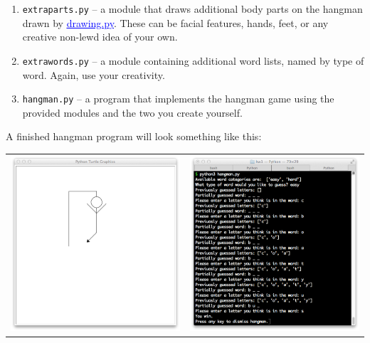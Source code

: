 \documentclass[12pt]{article}
\newcommand{\link}[2]{\href{#1}{\textcolor{blue}{\underline{#2}}}}
\newcommand{\code}{http://www.cc.gatech.edu/~simpkins/teaching/gatech/cs2316/code}
\begin{document}
\begin{enumerate}
\itemsep0em
\item {\tt extraparts.py} -- a module that draws additional body parts on the hangman drawn by \link{\code/hanglib/drawing.py}{drawing.py}.  These can be facial features, hands, feet, or any creative non-lewd idea of your own.
\item {\tt extrawords.py} -- a module containing additional word lists, named by type of word.  Again, use your creativity.
\item {\tt hangman.py} -- a program that implements the hangman game using the provided modules and the two you create yourself.
\end{enumerate}

A finished hangman program will look something like this:

\begin{tabular}{cc}
\includegraphics[width=3in]{hangman-fig.png} &
\includegraphics[width=3in]{hangman-console.png}
\end{tabular}
\end{document}
